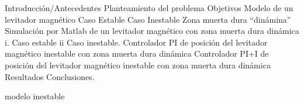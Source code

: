 Introducción/Antecedentes
Planteamiento del problema
Objetivos
Modelo de un levitador magnético
Caso Estable
Caso Inestable
Zona muerta dura “dinámina”
Simulación por Matlab de un levitador magnético con zona muerta dura dinámica
 i. Caso estable
 ii Caso inestable.
Controlador PI de posición del levitador magnético inestable con zona muerta dura dinámica
Controlador PI+I de posición del levitador magnético inestable con zona muerta dura dinámica
Resultados
Conclusiones.



modelo inestable
